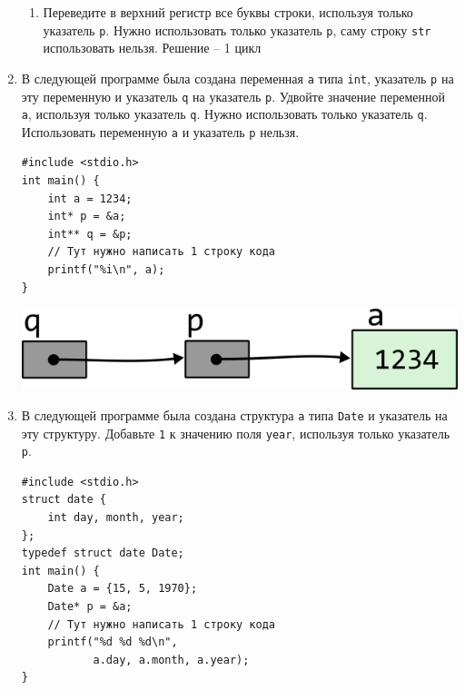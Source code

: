 \documentclass{article}
\begin{document}
\begin{enumerate}
\begin{enumerate}
\item Переведите в верхний регистр все буквы строки, используя только указатель \texttt{p}. Нужно использовать только указатель \texttt{p}, саму строку \texttt{str} использовать нельзя. Решение -- 1 цикл
\end{enumerate}


\item В следующей программе была создана переменная \texttt{a} типа \texttt{int}, указатель \texttt{p} на эту переменную и указатель \texttt{q} на указатель \texttt{p}. Удвойте значение переменной \texttt{a}, используя только указатель \texttt{q}. Нужно использовать только указатель \texttt{q}. Использовать переменную \texttt{a} и указатель \texttt{p} нельзя.
\begin{multicols}{2}
\begin{lstlisting}
#include <stdio.h>
int main() {
    int a = 1234;
    int* p = &a;
    int** q = &p;
    // Тут нужно написать 1 строку кода
    printf("%i\n", a);
}
\end{lstlisting}

\vfill \null    
\columnbreak
\vfill \null 


\begin{center}
\includegraphics[scale=1]{../images/pointer_schemes/pointer_to_pointer_to_int.png}
\end{center}

\end{multicols}



\item В следующей программе была создана структура \texttt{a} типа \texttt{Date} и указатель на эту структуру. Добавьте \texttt{1} к значению поля \texttt{year}, используя только указатель \texttt{p}.
\begin{multicols}{2}
\begin{lstlisting}
#include <stdio.h>
struct date {
    int day, month, year;
};
typedef struct date Date;
int main() {
    Date a = {15, 5, 1970};
    Date* p = &a;
    // Тут нужно написать 1 строку кода
    printf("%d %d %d\n", 
           a.day, a.month, a.year);
}
\end{lstlisting}

\vfill \null    
\columnbreak
\vfill \null 


\end{multicols}
\end{enumerate}
\end{document}
